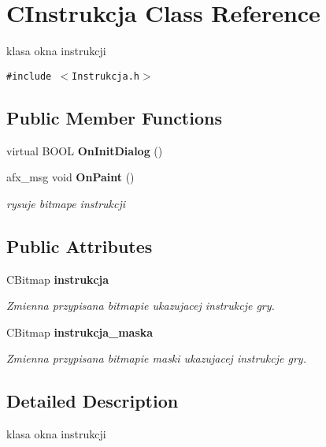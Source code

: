 \section{CInstrukcja Class Reference}
\label{class_c_instrukcja}
klasa okna instrukcji  


{\tt \#include $<$Instrukcja.h$>$}

\subsection*{Public Member Functions}
\begin{CompactItemize}
\item 
virtual BOOL {\bf OnInitDialog} ()
\item 
afx\_\-msg void {\bf OnPaint} ()
\begin{CompactList}\small\item\em rysuje bitmape instrukcji \item\end{CompactList}\end{CompactItemize}
\subsection*{Public Attributes}
\begin{CompactItemize}
\item 
CBitmap {\bf instrukcja}\label{class_c_instrukcja_dae04458c710dbf7961f24d97618fabe}

\begin{CompactList}\small\item\em Zmienna przypisana bitmapie ukazujacej instrukcje gry. \item\end{CompactList}\item 
CBitmap {\bf instrukcja\_\-maska}\label{class_c_instrukcja_ea1558854872bde01d185b697a0589d7}

\begin{CompactList}\small\item\em Zmienna przypisana bitmapie maski ukazujacej instrukcje gry. \item\end{CompactList}\end{CompactItemize}


\subsection{Detailed Description}
klasa okna instrukcji 



